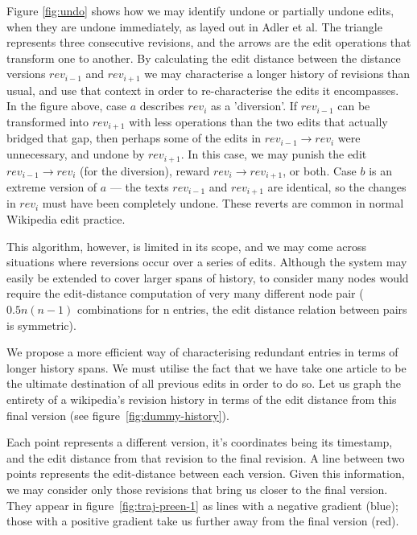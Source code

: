 Figure \ref{fig:undo} shows how we may identify undone or partially
undone edits, when they are undone immediately, as layed out in Adler
et al.\cite{Adler2007} The triangle represents three consecutive
revisions, and the arrows are the edit operations that transform one
to another. By calculating the edit distance between the distance
versions $rev_{i-1}$ and $rev_{i+1}$ we may characterise a longer history
of revisions than usual, and use that context in order to
re-characterise the edits it encompasses. In the figure above, case
$a$ describes $rev_i$ as a 'diversion'. If $rev_{i-1}$ can be transformed
into $rev_{i+1}$ with less operations than the two edits that actually
bridged that gap, then perhaps some of the edits in $rev_{i-1}
\rightarrow rev_i$ were unnecessary, and undone by $rev_{i+1}$. In this
case, we may punish the edit $rev_{i-1} \rightarrow rev_i$ (for the
diversion), reward $rev_{i} \rightarrow rev_{i+1}$, or both. Case $b$ is
an extreme version of $a$ --- the texts $rev_{i-1}$ and $rev_{i+1}$ are
identical, so the changes in $rev_i$ must have been completely
undone. These reverts are common in normal Wikipedia edit
practice.\cite{wiki-revert}

This algorithm, however, is limited in its scope, and we may come
across situations where reversions occur over a series of
edits. Although the system may easily be extended to cover larger
spans of history, to consider many nodes would require the
edit-distance computation of very many different node pair
($0.5n(n-1)$ combinations for n entries, the edit distance relation
between pairs is symmetric).

We propose a more efficient way of characterising redundant
entries in terms of longer history spans. We must utilise the fact
that we have take one article to be the ultimate destination of all
previous edits in order to do so. Let us graph the entirety of a
wikipedia's revision history in terms of the edit distance from this
final version (see figure~\ref{fig:dummy-history}).

Each point represents a different version, it's coordinates being its
timestamp, and the edit distance from that revision to the final
revision. A line between two points represents the edit-distance
between each version. Given this information, we may consider only
those revisions that bring us closer to the final version. They appear
in figure~\ref{fig:traj-preen-1} as lines with a negative gradient
(blue); those with a positive gradient take us further away from the
final version (red).

